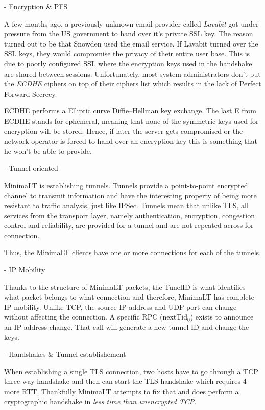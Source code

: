 \documentclass{vldb}
\begin{document}
- Encryption \& PFS

A few months ago, a previously unknown email provider called \emph{Lavabit} got under pressure from the US government to hand over it's private SSL key. The reason turned out to be that Snowden used the email service. If Lavabit turned over the SSL keys, they would compromise the privacy of their entire user base. This is due to poorly configured SSL where the encryption keys used in the handshake are shared between sessions. Unfortunately, most system administrators don't put the \emph{ECDHE} ciphers on top of their ciphers list which results in the lack of Perfect Forward Secrecy.

ECDHE performs a Elliptic curve Diffie–Hellman key exchange. The last E from ECDHE stands for ephemeral, meaning that none of the symmetric keys used for encryption will be stored. Hence, if later the server gets compromised or the network operator is forced to hand over an encryption key this is something that he won't be able to provide.  

- Tunnel oriented

MinimaLT is establishing tunnels. Tunnels provide a point-to-point encrypted channel to transmit information and have the interesting property of being more resistant to traffic analysis, just like IPSec. Tunnels mean that unlike TLS, all services from the transport layer, namely authentication, encryption, congestion control and reliability, are provided for a tunnel and are not repeated across for connection.

Thus, the MinimaLT clients have one or more connections for each of the tunnels. 

- IP Mobility

Thanks to the structure of MinimaLT packets, the TunelID is what identifies what packet belongs to what connection and therefore, MinimaLT has complete IP mobility. Unlike TCP, the source IP address and UDP port can change without affecting the connection. A specific RPC (\emph{$\text{nextTid}_{0}$}) exists to announce an IP address change. That call will generate a new tunnel ID and change the keys.

- Handshakes \& Tunnel establishement

When establishing a single TLS connection, two hosts have to go through a TCP three-way handshake and then can start the TLS handshake which requires 4 more RTT. Thankfully MinimaLT attempts to fix that and does perform a cryptographic handshake in \emph{less time than unencrypted TCP}.
\end{document}
